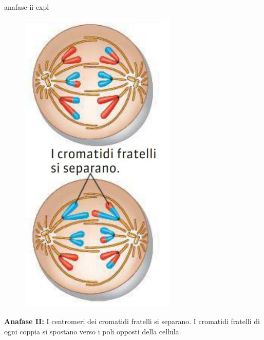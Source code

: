 \documentclass[preview]{standalone}
\begin{document}
\begin{snippet}{anafase-ii-expl}
    \setlength{\intextsep}{0pt}%
    \begin{figure}
        \includegraphics[width=7.5cm]{./resources/anafase-ii.png}
        \vspace{-1cm}
    \end{figure}

    \textbf{Anafase II:}
    I centromeri dei cromatidi fratelli si separano. I cromatidi fratelli di ogni coppia si spostano
    verso i poli opposti della cellula.
    \wrapfill
\end{snippet}
\end{document}
